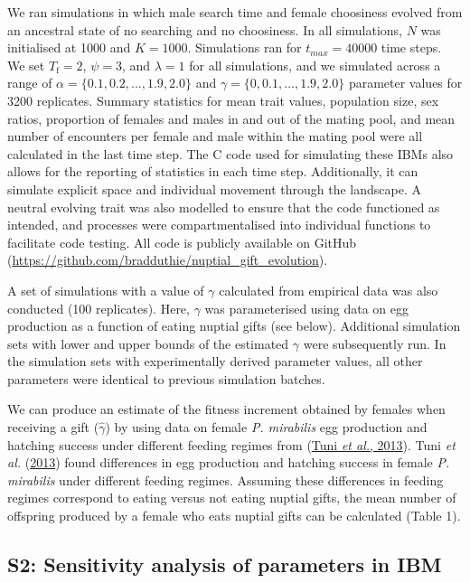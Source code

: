 \documentclass[
]{article}
\begin{document}
We ran simulations in which male search time and female choosiness
evolved from an ancestral state of no searching and no choosiness. In
all simulations, \(N\) was initialised at 1000 and \(K = 1000\).
Simulations ran for \(t_{max} = 40000\) time steps. We set
\(T_{\mathrm{f}} = 2\), \(\psi = 3\), and \(\lambda = 1\) for all
simulations, and we simulated across a range of
\(\alpha = \{0.1, 0.2, ..., 1.9, 2.0\}\) and
\(\gamma = \{0, 0.1, ..., 1.9, 2.0\}\) parameter values for 3200
replicates. Summary statistics for mean trait values, population size,
sex ratios, proportion of females and males in and out of the mating
pool, and mean number of encounters per female and male within the
mating pool were all calculated in the last time step. The C code used
for simulating these IBMs also allows for the reporting of statistics in
each time step. Additionally, it can simulate explicit space and
individual movement through the landscape. A neutral evolving trait was
also modelled to ensure that the code functioned as intended, and
processes were compartmentalised into individual functions to facilitate
code testing. All code is publicly available on GitHub
(\url{https://github.com/bradduthie/nuptial_gift_evolution}).

A set of simulations with a value of \(\gamma\) calculated from
empirical data was also conducted (100 replicates). Here, \(\gamma\) was
parameterised using data on egg production as a function of eating
nuptial gifts (see below). Additional simulation sets with lower and
upper bounds of the estimated \(\gamma\) were subsequently run. In the
simulation sets with experimentally derived parameter values, all other
parameters were identical to previous simulation batches.

We can produce an estimate of the fitness increment obtained by females
when receiving a gift (\(\hat{\gamma}\)) by using data on female
\emph{P. mirabilis} egg production and hatching success under different
feeding regimes from (\protect\hyperlink{ref-Tuni2013a}{Tuni \emph{et
al.}, 2013}). Tuni \emph{et al.}
(\protect\hyperlink{ref-Tuni2013a}{2013}) found differences in egg
production and hatching success in female \emph{P. mirabilis} under
different feeding regimes. Assuming these differences in feeding regimes
correspond to eating versus not eating nuptial gifts, the mean number of
offspring produced by a female who eats nuptial gifts can be calculated
(Table 1).

\hypertarget{s2-sensitivity-analysis-of-parameters-in-ibm}{%
\subsection{S2: Sensitivity analysis of parameters in
IBM}\label{s2-sensitivity-analysis-of-parameters-in-ibm}}
\end{document}
